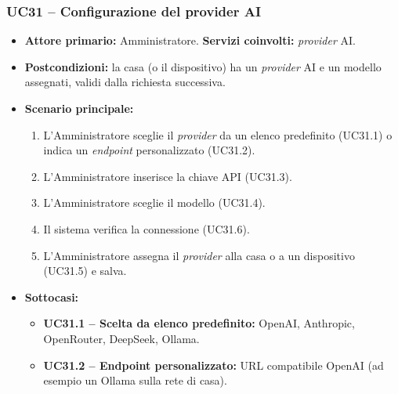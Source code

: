 \documentclass[12pt,a4paper]{article}
\newcommand{\tightlist}{\setlength{\itemsep}{1pt}\setlength{\parskip}{0pt}}
\begin{document}
\subsubsection{UC31 -- Configurazione del provider AI}

\begin{itemize}

\tightlist

\item \textbf{Attore primario:} Amministratore. \textbf{Servizi coinvolti:} \emph{provider} AI.

\item \textbf{Postcondizioni:} la casa (o il dispositivo) ha un \emph{provider} AI e un modello assegnati, validi dalla richiesta successiva.

\item \textbf{Scenario principale:}

\begin{enumerate}

\tightlist

\item L'Amministratore sceglie il \emph{provider} da un elenco predefinito (UC31.1) o indica un \emph{endpoint} personalizzato (UC31.2).

\item L'Amministratore inserisce la chiave API (UC31.3).

\item L'Amministratore sceglie il modello (UC31.4).

\item Il sistema verifica la connessione (UC31.6).

\item L'Amministratore assegna il \emph{provider} alla casa o a un dispositivo (UC31.5) e salva.

\end{enumerate}

\item \textbf{Sottocasi:}

\begin{itemize}

\tightlist

\item \textbf{UC31.1 -- Scelta da elenco predefinito:} OpenAI, Anthropic, OpenRouter, DeepSeek, Ollama.

\item \textbf{UC31.2 -- Endpoint personalizzato:} URL compatibile OpenAI (ad esempio un Ollama sulla rete di casa).


\end{itemize}
\end{itemize}
\end{document}
